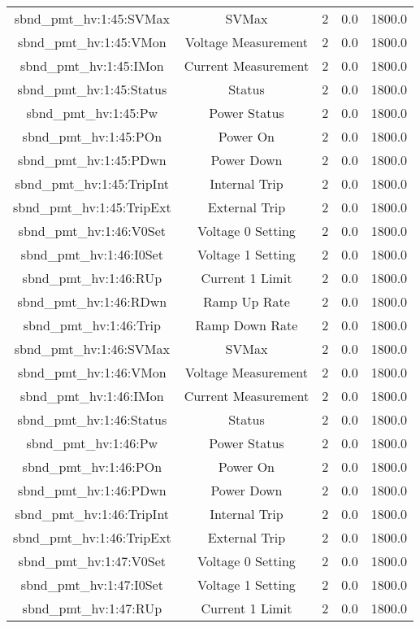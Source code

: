 \begin{center}
\begin{longtable}{c | c c c c }
sbnd\_pmt\_hv:1:45:SVMax & SVMax & 2 & 0.0 & 1800.0\\ 
sbnd\_pmt\_hv:1:45:VMon & Voltage Measurement & 2 & 0.0 & 1800.0\\ 
sbnd\_pmt\_hv:1:45:IMon & Current Measurement & 2 & 0.0 & 1800.0\\ 
sbnd\_pmt\_hv:1:45:Status & Status & 2 & 0.0 & 1800.0\\ 
sbnd\_pmt\_hv:1:45:Pw & Power Status & 2 & 0.0 & 1800.0\\ 
sbnd\_pmt\_hv:1:45:POn & Power On & 2 & 0.0 & 1800.0\\ 
sbnd\_pmt\_hv:1:45:PDwn & Power Down & 2 & 0.0 & 1800.0\\ 
sbnd\_pmt\_hv:1:45:TripInt & Internal Trip & 2 & 0.0 & 1800.0\\ 
sbnd\_pmt\_hv:1:45:TripExt & External Trip & 2 & 0.0 & 1800.0\\ 
sbnd\_pmt\_hv:1:46:V0Set & Voltage 0 Setting & 2 & 0.0 & 1800.0\\ 
sbnd\_pmt\_hv:1:46:I0Set & Voltage 1 Setting & 2 & 0.0 & 1800.0\\ 
sbnd\_pmt\_hv:1:46:RUp & Current 1 Limit & 2 & 0.0 & 1800.0\\ 
sbnd\_pmt\_hv:1:46:RDwn & Ramp Up Rate & 2 & 0.0 & 1800.0\\ 
sbnd\_pmt\_hv:1:46:Trip & Ramp Down Rate & 2 & 0.0 & 1800.0\\ 
sbnd\_pmt\_hv:1:46:SVMax & SVMax & 2 & 0.0 & 1800.0\\ 
sbnd\_pmt\_hv:1:46:VMon & Voltage Measurement & 2 & 0.0 & 1800.0\\ 
sbnd\_pmt\_hv:1:46:IMon & Current Measurement & 2 & 0.0 & 1800.0\\ 
sbnd\_pmt\_hv:1:46:Status & Status & 2 & 0.0 & 1800.0\\ 
sbnd\_pmt\_hv:1:46:Pw & Power Status & 2 & 0.0 & 1800.0\\ 
sbnd\_pmt\_hv:1:46:POn & Power On & 2 & 0.0 & 1800.0\\ 
sbnd\_pmt\_hv:1:46:PDwn & Power Down & 2 & 0.0 & 1800.0\\ 
sbnd\_pmt\_hv:1:46:TripInt & Internal Trip & 2 & 0.0 & 1800.0\\ 
sbnd\_pmt\_hv:1:46:TripExt & External Trip & 2 & 0.0 & 1800.0\\ 
sbnd\_pmt\_hv:1:47:V0Set & Voltage 0 Setting & 2 & 0.0 & 1800.0\\ 
sbnd\_pmt\_hv:1:47:I0Set & Voltage 1 Setting & 2 & 0.0 & 1800.0\\ 
sbnd\_pmt\_hv:1:47:RUp & Current 1 Limit & 2 & 0.0 & 1800.0\\ 

\end{longtable}
\end{center}
